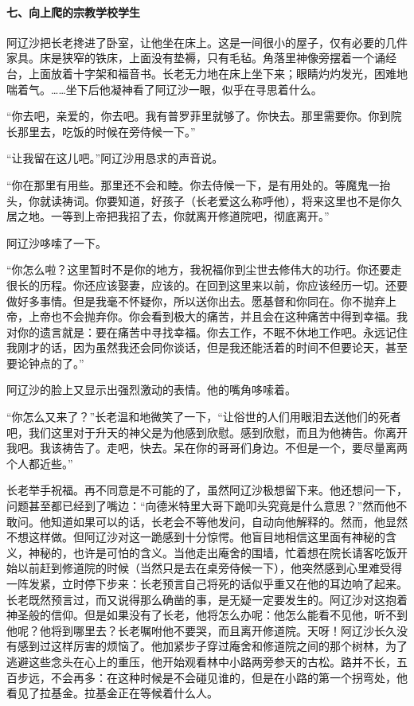 \paragraph*{七、向上爬的宗教学校学生}
\par 阿辽沙把长老搀进了卧室，让他坐在床上。这是一间很小的屋子，仅有必要的几件家具。床是狭窄的铁床，上面没有垫褥，只有毛毡。角落里神像旁摆着一个诵经台，上面放着十字架和福音书。长老无力地在床上坐下来；眼睛灼灼发光，困难地喘着气。……坐下后他凝神看了阿辽沙一眼，似乎在寻思着什么。
\par “你去吧，亲爱的，你去吧。我有普罗菲里就够了。你快去。那里需要你。你到院长那里去，吃饭的时候在旁侍候一下。”
\par “让我留在这儿吧。”阿辽沙用恳求的声音说。
\par “你在那里有用些。那里还不会和睦。你去侍候一下，是有用处的。等魔鬼一抬头，你就读祷词。你要知道，好孩子（长老爱这么称呼他），将来这里也不是你久居之地。一等到上帝把我招了去，你就离开修道院吧，彻底离开。”
\par 阿辽沙哆嗦了一下。
\par “你怎么啦？这里暂时不是你的地方，我祝福你到尘世去修伟大的功行。你还要走很长的历程。你还应该娶妻，应该的。在回到这里来以前，你应该经历一切。还要做好多事情。但是我毫不怀疑你，所以送你出去。愿基督和你同在。你不抛弃上帝，上帝也不会抛弃你。你会看到极大的痛苦，并且会在这种痛苦中得到幸福。我对你的遗言就是：要在痛苦中寻找幸福。你去工作，不眠不休地工作吧。永远记住我刚才的话，因为虽然我还会同你谈话，但是我还能活着的时间不但要论天，甚至要论钟点的了。”
\par 阿辽沙的脸上又显示出强烈激动的表情。他的嘴角哆嗦着。
\par “你怎么又来了？”长老温和地微笑了一下，“让俗世的人们用眼泪去送他们的死者吧，我们这里对于升天的神父是为他感到欣慰。感到欣慰，而且为他祷告。你离开我吧。我该祷告了。走吧，快去。呆在你的哥哥们身边。不但是一个，要尽量离两个人都近些。”
\par 长老举手祝福。再不同意是不可能的了，虽然阿辽沙极想留下来。他还想问一下，问题甚至都已经到了嘴边：“向德米特里大哥下跪叩头究竟是什么意思？”然而他不敢问。他知道如果可以的话，长老会不等他发问，自动向他解释的。然而，他显然不想这样做。但阿辽沙对这一跪感到十分惊愕。他盲目地相信这里面有神秘的含义，神秘的，也许是可怕的含义。当他走出庵舍的围墙，忙着想在院长请客吃饭开始以前赶到修道院的时候（当然只是去在桌旁侍候一下），他突然感到心里难受得一阵发紧，立时停下步来：长老预言自己将死的话似乎重又在他的耳边响了起来。长老既然预言过，而又说得那么确凿的事，是无疑一定要发生的。阿辽沙对这抱着神圣般的信仰。但是如果没有了长老，他将怎么办呢：他怎么能看不见他，听不到他呢？他将到哪里去？长老嘱咐他不要哭，而且离开修道院。天呀！阿辽沙长久没有感到过这样厉害的烦恼了。他加紧步子穿过庵舍和修道院之间的那个树林，为了逃避这些念头在心上的重压，他开始观看林中小路两旁参天的古松。路并不长，五百步远，不会再多：在这种时候是不会碰见谁的，但是在小路的第一个拐弯处，他看见了拉基金。拉基金正在等候着什么人。

